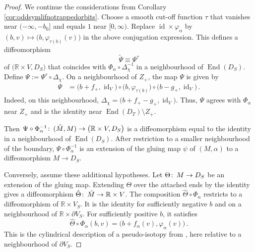 \documentclass{amsart}
\theoremstyle{definition}
\def\co{\colon\thinspace}
\newcommand{\R}{\mathbb R}
\newcommand{\ra}{\rightarrow}
\DeclareMathOperator{\End}{\mathrm{End}}
\DeclareMathOperator{\id}{\mathrm{id}}
\begin{document}
\begin{proof}
We continue the considerations
from Corollary \ref{cor:oddsymlifnotrappedorbits}.
Choose a smooth cut-off function $\tau$
that vanishes near $(-\infty,-b_0]$ and equals $1$ near $[0,\infty)$.
Replace $\id\times\varphi_{\alpha}$
by $(b,v)\mapsto\big(b,\varphi_{\tau(b)}(v)\big)$
in the above conjugation expression.
This defines a diffeomorphism
\[
\tilde{\Psi}\equiv\Psi^{\tau}
\]
of $\big(\R\times V,D_S\big)$
that coincides with $\Phi_{\alpha}\circ\Delta_{\chi}^{-1}$
in a neighbourhood of $\End(D_S)$.
Define $\Psi:=\Psi^{\tau}\circ\Delta_{\chi}$.
On a neighbourhood of $Z_+$, the map $\Psi$ is given by
\[
\begin{aligned}
\Psi
&=
\big(b+f_+,\id_V\!\big)
\circ
\big(b,\varphi_{\tau(b)}\big)
\circ
\big(b-g_+,\id_V\!\big)
\,.
\end{aligned}
\]
Indeed, on this neighbourhood,
$\Delta_{\chi}=\big(b+f_+-g_+,\id_V\!\big)$.
Thus, $\Psi$ agrees with $\Phi_{\alpha}$
near $Z_+$ and is the identity near
$\End(D_T)\setminus Z_+$.

Then
$\Psi\circ\Phi_{\alpha}^{-1}\co(\hat{M},M)\ra\big(\R\times V,D_S\big)$
is a diffeomorphism
equal to the identity in a neighbourhood of $\End(D_S)$.
After restriction to a smaller neighbourhood of the boundary,
$\Psi\circ\Phi_{\alpha}^{-1}$ is an extension
of the gluing map $\psi$ of $(M,\alpha)$
to a diffeomorphism $M\ra D_S$.

Conversely, assume these additional hypotheses.
Let $\Theta\co M\ra D_S$ be an extension of the gluing map.
Extending $\Theta$ over the attached ends by the identity
gives a diffeomorphism
$\hat{\Theta}\co\hat{M}\ra\R\times V$.
The composition
$\hat{\Theta}\circ\Phi_{\alpha}$
restricts to a diffeomorphism of $\R\times V_S$.
It is the identity for sufficiently negative $b$
and on a neighbourhood of $\R\times\partial V_S$.
For sufficiently positive $b$, it satisfies
\[
\hat{\Theta}\circ\Phi_{\alpha}(b,v)=
\big(b+f_{\alpha}(v),\varphi_{\alpha}(v)\big)
\,.
\]
This is the cylindrical description of a pseudo-isotopy
from \cite[Section~9.10]{ce12},
here relative to a neighbourhood of $\partial V_S$.


\end{proof}
\end{document}

